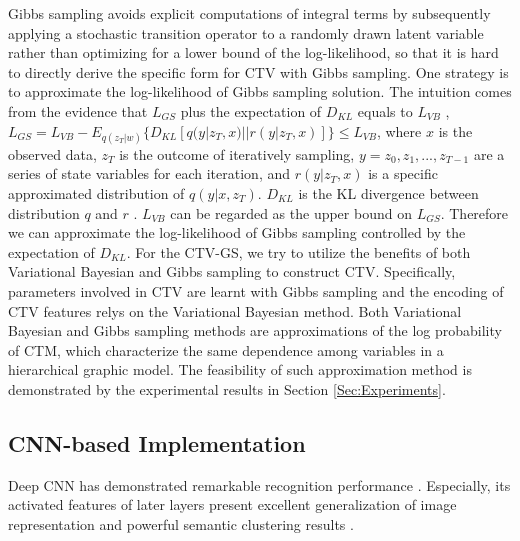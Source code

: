 \documentclass[journal]{IEEEtran}
\begin{document}
Gibbs sampling avoids explicit computations of integral terms by subsequently applying a stochastic transition operator to a randomly drawn latent variable rather than optimizing for a lower bound of the log-likelihood, so that it is hard to directly derive the specific form for CTV with Gibbs sampling. One strategy is to approximate the log-likelihood of Gibbs sampling solution. The intuition comes from the evidence that ${L_{GS}}$ plus the expectation of ${D_{KL}}$ equals to ${L_{VB}}$ \cite{salimans2014markov},
${L_{GS}} = {L_{VB}} - {E_{q({z_T}|w)}}\{ {D_{KL}}[q(y|{z_T},x)||r(y|{z_T},x)]\} \le {L_{VB}}$, where $x$ is the observed data, ${z_T}$ is the outcome of iteratively sampling, $y = {z_0},{z_1},...,{z_{T - 1}}$ are a series of state variables for each iteration, and $r(y|{z_T},x)$ is a specific approximated distribution of $q(y|x,{z_T})$. ${D_{KL}}$ is the KL divergence between distribution $q$ and $r$ \cite{salimans2014markov}. ${L_{VB}}$ can be regarded as the upper bound on ${L_{GS}}$. Therefore we can approximate the log-likelihood of Gibbs sampling controlled by the expectation of ${D_{KL}}$. For the CTV-GS, we try to utilize the benefits of both Variational Bayesian and Gibbs sampling to construct CTV. Specifically, parameters involved in CTV are learnt with Gibbs sampling and the encoding of CTV features relys on the Variational Bayesian method. Both Variational Bayesian and Gibbs sampling methods are approximations of the log probability of CTM, which characterize the same dependence among variables in a hierarchical graphic model.
The feasibility of such approximation method is demonstrated by the experimental results in Section \ref{Sec:Experiments}.%

\subsection{CNN-based Implementation}
Deep CNN has demonstrated remarkable recognition performance \cite{krizhevsky2012imagenet, donahue2013decaf, jia2014caffe}. Especially, its activated features of later layers present excellent generalization of image representation and powerful semantic clustering results \cite{donahue2013decaf}.
\end{document}
